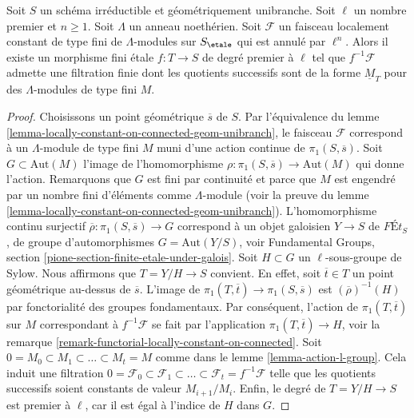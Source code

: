 \begin{lemma}
\label{lemma-pullback-filtered-modules}
Soit $S$ un sch\'ema irr\'eductible et g\'eom\'etriquement unibranche.
Soit $\ell$ un nombre premier et $n \geq 1$. Soit $\Lambda$
un anneau noeth\'erien. Soit $\mathcal{F}$ un faisceau localement
constant de type fini de $\Lambda$-modules sur $S_\etale$
qui est annul\'e par $\ell^n$. Alors il existe un
morphisme fini \'etale $f : T \to S$ de degr\'e premier \`a $\ell$
tel que $f^{-1}\mathcal{F}$ admette une filtration finie dont les
quotients successifs sont de la forme $\underline{M}_T$
pour des $\Lambda$-modules de type fini $M$.
\end{lemma}

\begin{proof}
Choisissons un point g\'eom\'etrique $\overline{s}$ de $S$.
Par l'\'equivalence du
lemme \ref{lemma-locally-constant-on-connected-geom-unibranch},
le faisceau $\mathcal{F}$ correspond \`a un $\Lambda$-module de type fini
$M$ muni d'une action continue de $\pi_1(S, \overline{s})$.
Soit $G \subset \text{Aut}(M)$ l'image de l'homomorphisme
$\rho : \pi_1(S, \overline{s}) \to \text{Aut}(M)$ qui donne l'action.
Remarquons que $G$ est fini par continuit\'e et parce que $M$ est engendr\'e
par un nombre fini d'\'el\'ements comme $\Lambda$-module (voir la preuve du lemme \ref{lemma-locally-constant-on-connected-geom-unibranch}).
L'homomorphisme continu surjectif
$\overline{\rho} : \pi_1(S, \overline{s}) \to G$
correspond \`a un objet galoisien $Y \to S$ de
$\textit{F\'Et}_S$, de groupe d'automorphismes $G = \text{Aut}(Y/S)$, voir
Fundamental Groups, section \ref{pione-section-finite-etale-under-galois}.
Soit $H \subset G$ un $\ell$-sous-groupe de Sylow.
Nous affirmons que $T = Y/H \to S$ convient. En effet, soit $\overline{t} \in T$
un point g\'eom\'etrique au-dessus de $\overline{s}$. L'image de
$\pi_1(T, \overline{t}) \to \pi_1(S, \overline{s})$
est $(\overline{\rho})^{-1}(H)$ par fonctorialit\'e
des groupes fondamentaux. Par cons\'equent, l'action de $\pi_1(T, \overline{t})$
sur $M$ correspondant \`a $f^{-1}\mathcal{F}$ se fait par
l'application $\pi_1(T, \overline{t}) \to H$, voir la
remarque \ref{remark-functorial-locally-constant-on-connected}.
Soit $0 = M_0 \subset M_1 \subset \ldots \subset M_t = M$
comme dans le lemme \ref{lemma-action-l-group}.
Cela induit une filtration
$0 = \mathcal{F}_0 \subset \mathcal{F}_1 \subset \ldots
\subset \mathcal{F}_t = f^{-1}\mathcal{F}$
telle que les quotients successifs soient constants de
valeur $M_{i + 1}/M_i$.
Enfin, le degr\'e de $T = Y/H \to S$ est premier \`a $\ell$,
car il est \'egal \`a l'indice de $H$ dans $G$.
\end{proof}






